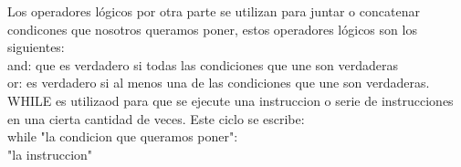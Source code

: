 \documentclass[letterpaper, 12pt, oneside]{article}%
\begin{document}
	Los operadores lógicos por otra parte se utilizan para juntar o concatenar condicones que nosotros queramos poner, estos operadores lógicos son los siguientes:\\
	
	and: que es verdadero si todas las condiciones que une son verdaderas\\
	or: es verdadero si al menos una de las condiciones que une son verdaderas.\\
	
	WHILE es utilizaod para que se ejecute una instruccion o serie de instrucciones en una cierta cantidad de veces. Este ciclo se escribe:\\
	
	while "la condicion que queramos poner":\\
	"la instruccion"
	
	
	
		
	
	
	
	
	
	
	
	


	
	
	
	
	
	
	
	
	
	
	
	
	
	
	
	
\end{document}
